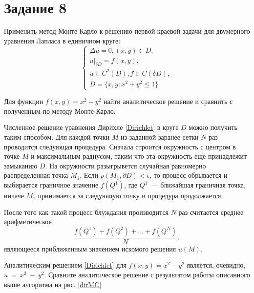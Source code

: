 \section{Задание 8}

Применить метод Монте-Карло к решению первой краевой задачи для двумерного 
уравнения Лапласа в единичном круге:
\begin{equation} \label{Dirichlet}
    \left\{
    \begin{array}{lcr}
        \Delta u = 0,(x,y) \in D,        \\
        u |_{\delta D }= f(x,y),         \\
        u \in C^2(D), f \in C(\delta D), \\
        D= \{ x,y: x^2 + y^2 \le 1 \}
    \end{array}
    \right.
\end{equation}

Для функции $f(x,y) = x^2 - y^2$ найти аналитическое решение и сравнить с 
полученным по методу Монте-Карло.

\bigskip

Численное решение уравнения Дирихле \eqref{Dirichlet} в круге $D$ можно 
получить таким способом. Для каждой точки $M$ из заданной заранее сетки $N$ 
раз проводится следующая процедура. Сначала строится окружность с центром в 
точке $M$ и максимальным радиусом, таким что эта окружность еще принадлежит 
замыканию $D$. На окружности разыгрывется случайная равномерно распределенная 
точка $M_1$. Если $\rho(M_1, \partial D) < \epsilon$, то процесс 
обрывается и выбирается граничное значение $f(Q^1)$, где $Q^1$~--- ближайшая 
граничная точка, инчаче $M_1$ принимается за следующую точку и процедура 
продолжается. 

После того как такой процесс блуждания производится $N$ раз считается среднее 
арифметическое 
\begin{equation*}
    \frac{f(Q^1) + f(Q^2) + \ldots + f(Q^N)}{N},
\end{equation*}
являющееся приближенным значением искомого решения $u(M)$.

Аналитическим решением \eqref{Dirichlet} для $f(x,y) = x^2 - y^2$ является, 
очевидно, $u~=~x^2~-~y^2$. Сравните аналитическое решение с результатом работы 
описанного выше алгоритма на рис. \ref{dirMC}

